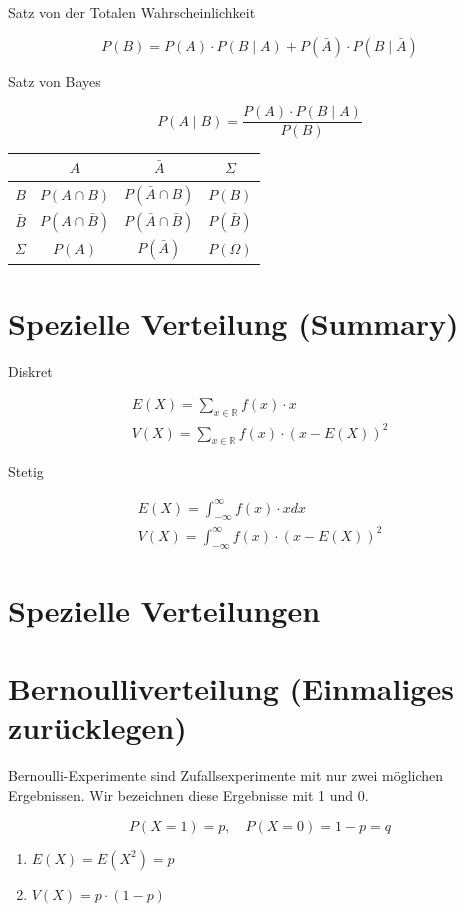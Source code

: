 \documentclass[10pt]{article}
\begin{document}
Satz von der Totalen Wahrscheinlichkeit

$$
P(B)=P(A) \cdot P(B \mid A)+P(\bar{A}) \cdot P(B \mid \bar{A})
$$

Satz von Bayes

$$
P(A \mid B)=\frac{P(A) \cdot P(B \mid A)}{P(B)}
$$

\begin{center}
\begin{tabular}{|c|c|c|c|}
\hline
 & $A$ & $\bar{A}$ & $\Sigma$ \\
\hline
$B$ & $P(A \cap B)$ & $P(\bar{A} \cap B)$ & $P(B)$ \\
\hline
$\bar{B}$ & $P(A \cap \bar{B})$ & $P(\bar{A} \cap \bar{B})$ & $P(\bar{B})$ \\
\hline
$\Sigma$ & $P(A)$ & $P(\bar{A})$ & $P(\Omega)$ \\
\hline
\end{tabular}
\end{center}

\section*{Spezielle Verteilung (Summary)}
Diskret

$$
\begin{gathered}
E(X)=\sum_{x \in \mathbb{R}} f(x) \cdot x \\
V(X)=\sum_{x \in \mathbb{R}} f(x) \cdot(x-E(X))^{2}
\end{gathered}
$$

Stetig

$$
\begin{gathered}
E(X)=\int_{-\infty}^{\infty} f(x) \cdot x d x \\
V(X)=\int_{-\infty}^{\infty} f(x) \cdot(x-E(X))^{2}
\end{gathered}
$$

\section*{Spezielle Verteilungen}
\section*{Bernoulliverteilung (Einmaliges zurücklegen)}
Bernoulli-Experimente sind Zufallsexperimente mit nur zwei möglichen Ergebnissen. Wir bezeichnen diese Ergebnisse mit 1 und 0.

$$
P(X=1)=p, \quad P(X=0)=1-p=q
$$

\begin{enumerate}
  \item $E(X)=E\left(X^{2}\right)=p$
  \item $V(X)=p \cdot(1-p)$
\end{enumerate}
\end{document}
